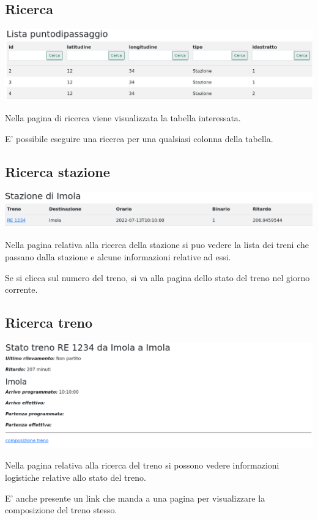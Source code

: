 \documentclass[a4paper,12pt]{report}
\begin{document}
	\subsection{Ricerca}
	\includegraphics[width=\linewidth]{res/screenshots/lista.png}
	\par Nella pagina di ricerca viene visualizzata la tabella interessata.
	\par E' possibile eseguire una ricerca per una qualsiasi colonna della tabella.
	\subsection{Ricerca stazione}
	\includegraphics[width=\linewidth]{res/screenshots/stazione.png}
	\par Nella pagina relativa alla ricerca della stazione si puo vedere la lista dei treni che passano dalla stazione e alcune informazioni relative ad essi.
	\par Se si clicca sul numero del treno, si va alla pagina dello stato del treno nel giorno corrente.
	\subsection{Ricerca treno}
	\includegraphics[width=\linewidth]{res/screenshots/stato_treno.png}
	\par Nella pagina relativa alla ricerca del treno si possono vedere informazioni logistiche relative allo stato del treno.
	\par E' anche presente un link che manda a una pagina per visualizzare la composizione del treno stesso.
\end{document}
